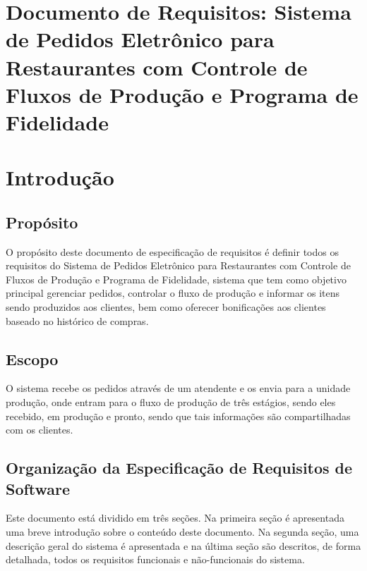 \documentclass[article, 12pt, oneside, a4paper, brazil]{abntex2}
\begin{document}
\frenchspacing

\pretextual

\imprimircapa

\tableofcontents*
\cleardoublepage

\textual

 \section*{\textbf{Documento de Requisitos:} Sistema de Pedidos Eletrônico para Restaurantes com Controle de Fluxos de Produção e Programa de Fidelidade}
 \section{Introdução}
 
 \subsection{Propósito}
 O propósito deste documento de especificação de requisitos é definir todos os requisitos do Sistema de Pedidos Eletrônico para Restaurantes com Controle de Fluxos de Produção e Programa de Fidelidade, sistema que tem como objetivo principal gerenciar pedidos, controlar o fluxo de produção e informar os itens sendo produzidos aos clientes, bem como oferecer bonificações aos clientes baseado no histórico de compras.
 
 \subsection{Escopo}
 O sistema recebe os pedidos através de um atendente e os envia para a unidade produção, onde entram para o fluxo de produção de três estágios, sendo eles recebido, em produção e pronto, sendo que tais informações são compartilhadas com os clientes.
 
 \subsection{Organização da Especificação de Requisitos de Software}
 
 Este documento está dividido em três seções. Na primeira seção é apresentada uma breve introdução sobre o conteúdo deste documento. Na segunda seção, uma descrição geral do sistema é apresentada e na última seção são descritos, de forma detalhada, todos os requisitos funcionais e não-funcionais do sistema.
 
\end{document}
